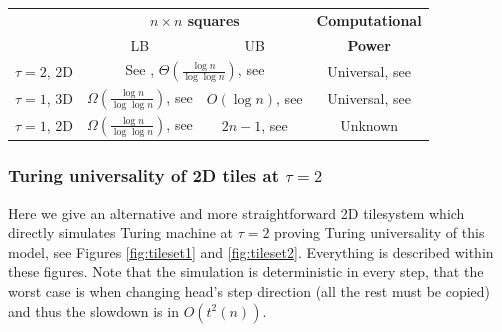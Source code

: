 	\begin{center}
	\begin{tabular}{|| c || c | c | c ||}
		\hline\hline
		~ & \multicolumn{2}{c|}{\bf $n\times n$ squares} & {\bf Computational} \\
		~ & \multicolumn{1}{c}{LB} & \multicolumn{1}{c|}{UB} & {\bf Power}\\
		\hline
		$\tau=2$, 2D & \multicolumn{2}{c|}{See \cite{square_lb}, $\Theta(\frac{\log n}{\log\log n})$, see \cite{square_ub}} & Universal, see \cite{winfree_phd} \\
		\hline
		$\tau=1$, 3D & $\Omega(\frac{\log n}{\log\log n})$, see \cite{square_lb} & $O(\log n)$, see \cite{cook_temp1} & Universal, see \cite{cook_temp1} \\
		\hline
		$\tau=1$, 2D & $\Omega(\frac{\log n}{\log\log n})$, see \cite{square_lb} & $2n-1$, see \cite{square_lb} & Unknown \\
		\hline\hline
	\end{tabular}
	\end{center}
	
	\subsubsection{Turing universality of 2D tiles at $\tau=2$}
		
		Here we give an alternative and more straightforward 2D tilesystem which directly simulates Turing machine at $\tau=2$ proving Turing universality of this model, see Figures \ref{fig:tileset1} and \ref{fig:tileset2}. Everything is described within these figures. Note that the simulation is deterministic in every step, that the worst case is when changing head's step direction (all the rest must be copied) and thus the slowdown is in $O(t^2(n))$.
		
